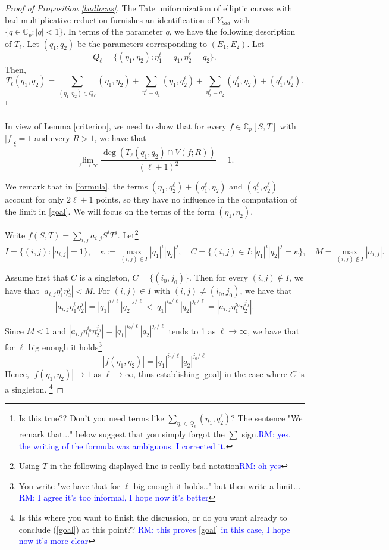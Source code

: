 \documentclass[a4paper,11pt]{amsart}
\newcommand{\ce}{\mathbb{C}}
\theoremstyle{definition}
\begin{document}
\begin{proof}[Proof of Proposition \ref{badlocus}]
The Tate uniformization of elliptic curves with bad multiplicative reduction furnishes an identification of $Y_{bad}$ with $\{ q \in \ce_p : |q|<1\}$. In terms of the parameter $q$, we have the following description of $T_\ell$. Let $(q_1,q_2)$ be the parameters corresponding to  $(E_1,E_2)$. Let $$Q_\ell=\{ (\eta_1,\eta_2) : \eta_1^\ell=q_1, \eta_2^\ell=q_2\}.$$ Then, 
\begin{equation}\label{formula}
T_\ell(q_1,q_2)=\sum_{(\eta_1,\eta_2)\in Q_\ell} (\eta_1,\eta_2)+\sum_{\eta_1^\ell=q_1}(\eta_1,q_2^\ell)+\sum_{\eta_2^\ell=q_2}(q_1^\ell, \eta_2)+(q_1^\ell,q_2^\ell).
\end{equation}
\footnote{Is this true?? Don't you need terms like $\sum_{\eta_1\in Q_\ell} (\eta_1, q_2^\ell)$? The sentence "We remark that..." below suggest that you simply forgot the $\sum$ sign.\textcolor{blue}{RM: yes, the writing of the formula was ambiguous. I corrected it.}}

In view of Lemma \ref{criterion}, we need to show that for every $f\in \ce_p[S,T]$ with $|f|_\xi=1$ and every $R>1$, we have that 
\begin{equation}\label{goal}
\lim_{\ell \rightarrow \infty}\frac{\deg (T_\ell(q_1,q_2)\cap V(f;R))}{(\ell+1)^2}=1.
\end{equation}

We remark that in \eqref{formula}, the terms $(\eta_1,q_2^\ell)+(q_1^\ell, \eta_2)$ and $(q_1^\ell,q_2^\ell)$ account for only $2\ell+1$ points, so they have no influence in the computation of the limit in \eqref{goal}. We will focus on the terms of the form $(\eta_1,\eta_2)$. 

Write $f(S,T)=\sum_{i,j}a_{i,j}S^iT^j$. Let\footnote{Using $T$ in the following displayed line is really bad notation\textcolor{blue}{RM: oh yes}} $$I=\{(i,j) : |a_{i,j}|=1\}, \quad \kappa:=\max_{(i,j) \in I} |q_1|^i|q_2|^j, \quad C=\{(i,j) \in I :  |q_1|^i|q_2|^j=\kappa \}, \quad M=\max_{(i,j)\notin I}|a_{i,j}|.$$ 

Assume first that $C$ is a singleton, $C=\{(i_0,j_0)\}$. Then for every $(i,j)\notin I$, we have that $|a_{i,j}\eta_1^i\eta_2^j|<M$. For $(i,j)\in I$ with $(i,j)\neq (i_0,j_0)$, we have that $$|a_{i,j}\eta_1^i\eta_2^j|=|q_1|^{i/\ell}|q_2|^{j/\ell}<|q_1|^{i_0/\ell}|q_2|^{j_0/\ell} =|a_{i,j} \eta_1^{i_0}\eta_2^{j_0}|.$$

Since $M<1$ and $|a_{i,j} \eta_1^{i_0}\eta_2^{j_0}|=|q_1|^{i_0/\ell}|q_2|^{j_0/\ell}$ tends to 1 as $\ell \rightarrow \infty$, we have that for $\ell$ big enough it holds\footnote{You write "we have that for $\ell$ big enough it holds.." but then write a limit... \textcolor{blue}{RM: I agree it's too informal, I hope now it's better}} $$|f(\eta_1,\eta_2)|=|q_1|^{i_0/\ell}|q_2|^{j_0/\ell}$$ Hence, $|f(\eta_1,\eta_2)| \rightarrow 1 $  as $\ell \rightarrow \infty$, thus establishing \eqref{goal} in the case where $C$ is a singleton.
\footnote{Is this where you want to finish the discussion, or do you want already to conclude (\ref{goal}) at this point?? \textcolor{blue}{RM: this proves \eqref{goal} in this case, I hope now it's more clear}}


\end{proof}
\end{document}

